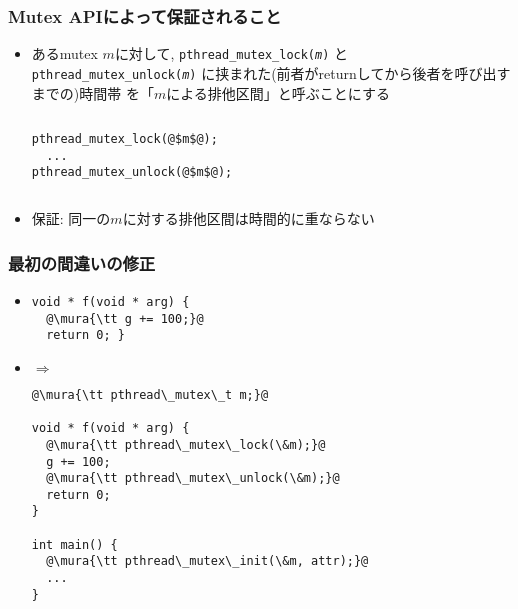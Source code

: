 \documentclass[12pt,dvipdfmx]{beamer}
\begin{document}
\begin{frame}[fragile]
  \frametitle{Mutex APIによって保証されること}
  \begin{itemize}
  \item あるmutex $m$に対して,
    {\tt pthread\_mutex\_lock({\it m})}
    と{\tt pthread\_mutex\_unlock({\it m})}
    に挟まれた(前者がreturnしてから後者を呼び出すまでの)時間帯
    を「$m$による排他区間」と呼ぶことにする
    \begin{columns}
      \begin{column}{0.5\textwidth}
\begin{lstlisting}
pthread_mutex_lock(@$m$@);
  ...
pthread_mutex_unlock(@$m$@);
\end{lstlisting}
      \end{column}
      \begin{column}{0.5\textwidth}
        \begin{center}
%
%
        \end{center}
      \end{column}
    \end{columns}
\item 保証: 同一の$m$に対する排他区間は時間的に重ならない
  \end{itemize}
\end{frame}

\begin{frame}[fragile]
  \frametitle{最初の間違いの修正}
  \begin{itemize}
  \item []
\begin{lstlisting}
void * f(void * arg) {
  @\mura{\tt g += 100;}@
  return 0; }
\end{lstlisting}
\item [] $\Rightarrow$
\begin{lstlisting}
@\mura{\tt pthread\_mutex\_t m;}@
    
void * f(void * arg) {
  @\mura{\tt pthread\_mutex\_lock(\&m);}@
  g += 100;
  @\mura{\tt pthread\_mutex\_unlock(\&m);}@
  return 0;
}

int main() {
  @\mura{\tt pthread\_mutex\_init(\&m, attr);}@
  ...
}
\end{lstlisting}
\end{itemize}
\end{frame}
\end{document}
